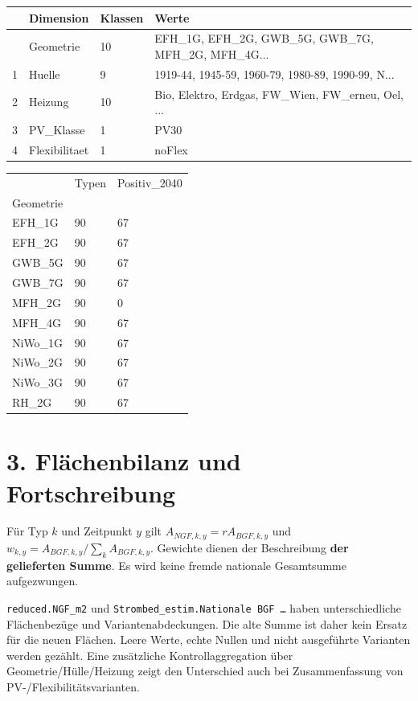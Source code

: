 \documentclass[
  ngerman,
  a4paper,
  DIV=11]{scrreprt}
\newcounter{none} %
\begin{document}
{\def\LTcaptype{none} %
\begin{longtable}[]{@{}llll@{}}
\toprule\noalign{}
& Dimension & Klassen & Werte \\
\midrule\noalign{}
\endhead
\bottomrule\noalign{}
\endlastfoot
0 & Geometrie & 10 & EFH\_1G, EFH\_2G, GWB\_5G, GWB\_7G, MFH\_2G,
MFH\_4G... \\
1 & Huelle & 9 & 1919-44, 1945-59, 1960-79, 1980-89, 1990-99, N... \\
2 & Heizung & 10 & Bio, Elektro, Erdgas, FW\_Wien, FW\_erneu, Oel,
... \\
3 & PV\_Klasse & 1 & PV30 \\
4 & Flexibilitaet & 1 & noFlex \\
\end{longtable}
}

{\def\LTcaptype{none} %
\begin{longtable}[]{@{}lll@{}}
\toprule\noalign{}
& Typen & Positiv\_2040 \\
Geometrie & & \\
\midrule\noalign{}
\endhead
\bottomrule\noalign{}
\endlastfoot
EFH\_1G & 90 & 67 \\
EFH\_2G & 90 & 67 \\
GWB\_5G & 90 & 67 \\
GWB\_7G & 90 & 67 \\
MFH\_2G & 90 & 0 \\
MFH\_4G & 90 & 67 \\
NiWo\_1G & 90 & 67 \\
NiWo\_2G & 90 & 67 \\
NiWo\_3G & 90 & 67 \\
RH\_2G & 90 & 67 \\
\end{longtable}
}

\section{3. Flächenbilanz und
Fortschreibung}\label{sec-gebaeude-flaechen}

Für Typ \(k\) und Zeitpunkt \(y\) gilt \(A_{NGF,k,y}=r A_{BGF,k,y}\) und
\(w_{k,y}=A_{BGF,k,y}/\sum_k A_{BGF,k,y}\). Gewichte dienen der
Beschreibung \textbf{der gelieferten Summe}. Es wird keine fremde
nationale Gesamtsumme aufgezwungen.

\texttt{reduced.NGF\_m2} und \texttt{Strombed\_estim.Nationale\ BGF\ …}
haben unterschiedliche Flächenbezüge und Variantenabdeckungen. Die alte
Summe ist daher kein Ersatz für die neuen Flächen. Leere Werte, echte
Nullen und nicht ausgeführte Varianten werden gezählt. Eine zusätzliche
Kontrollaggregation über Geometrie/Hülle/Heizung zeigt den Unterschied
auch bei Zusammenfassung von PV-/Flexibilitätsvarianten.
\end{document}
